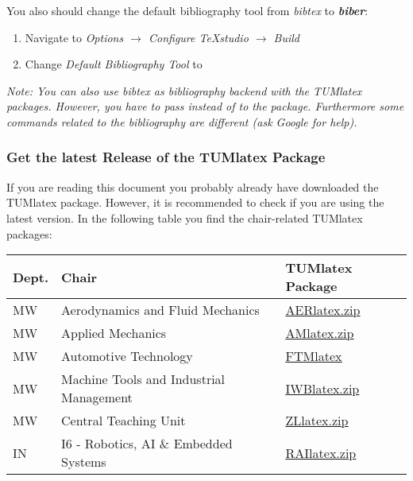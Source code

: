 You also should change the default bibliography tool from \textit{bibtex} to \textbf{\textit{biber}}:

\begin{enumerate}
    \item Navigate to \textit{Options $\rightarrow$ Configure TeXstudio $\rightarrow$ Build}
    \item Change \textit{Default Bibliography Tool} to 
\end{enumerate}


\textit{Note: You can also use bibtex as bibliography backend with the TUMlatex packages. However, you have to pass  instead of  to the package. Furthermore some commands related to the bibliography are different (ask Google for help).}

\subsubsection{Get the latest Release of the TUMlatex Package}\label{get-tumlatex}

If you are reading this document you probably already have downloaded the TUMlatex package.
However, it is recommended to check if you are using the latest version.
In the following table you find the chair-related TUMlatex packages:

\begin{table}[h]
    \centering
    \begin{tabular}{lll}
        \toprule
        Dept. & Chair & TUMlatex Package \\
        \midrule
        MW & Aerodynamics and Fluid Mechanics & \underline{\href{https://gitlab.lrz.de/AM/TUMlatex/-/jobs/artifacts/release/download?job=ReleaseMWAER}{AERlatex.zip}} \\
        MW & Applied Mechanics & \underline{\href{https://gitlab.lrz.de/AM/TUMlatex/-/jobs/artifacts/release/download?job=ReleaseMWAM}{AMlatex.zip}} \\
        MW & Automotive Technology & \underline{\href{https://wiki.tum.de/display/ftm/Latex-Vorlage}{FTMlatex}} \\
        MW & Machine Tools and Industrial Management & \underline{\href{https://gitlab.lrz.de/AM/TUMlatex/-/jobs/artifacts/release/download?job=ReleaseMWIWB}{IWBlatex.zip}} \\
        MW & Central Teaching Unit & \underline{\href{https://gitlab.lrz.de/AM/TUMlatex/-/jobs/artifacts/release/download?job=ReleaseMWZL}{ZLlatex.zip}} \\
        IN & I6 - Robotics, AI \& Embedded Systems & \underline{\href{https://gitlab.lrz.de/AM/TUMlatex/-/jobs/artifacts/release/download?job=ReleaseINRAI}{RAIlatex.zip}} \\
        \bottomrule
    \end{tabular}
\end{table}

